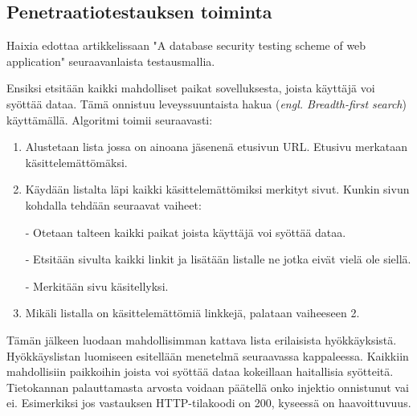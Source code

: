 \documentclass[finnish]{tktltiki2}
\theoremstyle{definition}
\theoremstyle{remark}
\begin{document}
	\subsection{Penetraatiotestauksen toiminta}
	 Haixia edottaa artikkelissaan "A database security testing scheme of web application"\space\cite{testing} seuraavanlaista testausmallia.
	
	Ensiksi etsitään kaikki mahdolliset paikat sovelluksesta, joista käyttäjä voi syöttää dataa. Tämä onnistuu leveyssuuntaista hakua (\textit{engl. Breadth-first search}) käyttämällä. Algoritmi toimii seuraavasti:
	\begin{enumerate}
		\item Alustetaan lista jossa on ainoana jäsenenä etusivun URL. Etusivu merkataan käsittelemättömäksi.
		
		\item Käydään listalta läpi kaikki käsittelemättömiksi merkityt sivut. Kunkin sivun kohdalla tehdään seuraavat vaiheet:
		
		- Otetaan talteen kaikki paikat joista käyttäjä voi syöttää dataa.
		
		- Etsitään sivulta kaikki linkit ja lisätään listalle ne jotka eivät vielä ole siellä.
		
		- Merkitään sivu käsitellyksi.
		
		\item Mikäli listalla on käsittelemättömiä linkkejä, palataan vaiheeseen 2.
	\end{enumerate}
	
	Tämän jälkeen luodaan mahdollisimman kattava lista erilaisista hyökkäyksistä. Hyökkäyslistan luomiseen esitellään menetelmä seuraavassa kappaleessa. Kaikkiin mahdollisiin paikkoihin joista voi syöttää dataa kokeillaan haitallisia syötteitä. Tietokannan palauttamasta arvosta voidaan päätellä onko injektio onnistunut vai ei. Esimerkiksi jos vastauksen HTTP-tilakoodi on 200, kyseessä on haavoittuvuus. 
	
\end{document}
